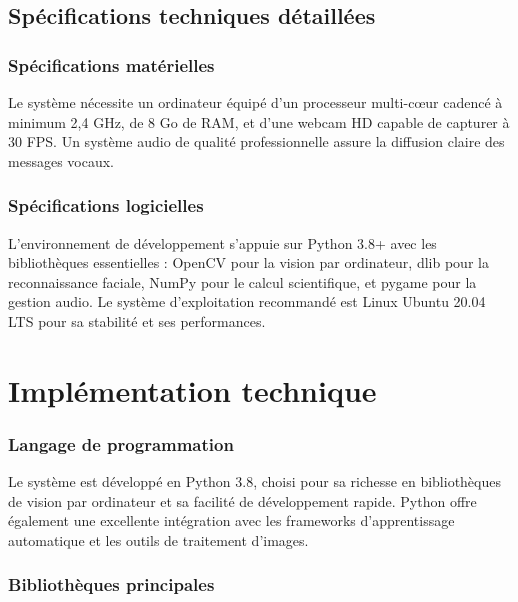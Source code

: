 \documentclass[12pt,a4paper]{article}
\begin{document}
\subsection{Spécifications techniques détaillées}

\subsubsection{Spécifications matérielles}

Le système nécessite un ordinateur équipé d'un processeur multi-cœur cadencé à minimum 2,4 GHz, de 8 Go de RAM, et d'une webcam HD capable de capturer à 30 FPS. Un système audio de qualité professionnelle assure la diffusion claire des messages vocaux.

\subsubsection{Spécifications logicielles}

L'environnement de développement s'appuie sur Python 3.8+ avec les bibliothèques essentielles : OpenCV pour la vision par ordinateur, dlib pour la reconnaissance faciale, NumPy pour le calcul scientifique, et pygame pour la gestion audio. Le système d'exploitation recommandé est Linux Ubuntu 20.04 LTS pour sa stabilité et ses performances.

\newpage

\section{Implémentation technique}

\subsubsection{Langage de programmation}

Le système est développé en Python 3.8, choisi pour sa richesse en bibliothèques de vision par ordinateur et sa facilité de développement rapide. Python offre également une excellente intégration avec les frameworks d'apprentissage automatique et les outils de traitement d'images.

\subsubsection{Bibliothèques principales}
\end{document}

